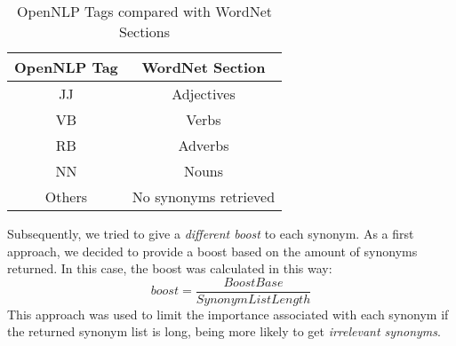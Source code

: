 \begin{table}[tbp]
    \caption{OpenNLP Tags compared with WordNet Sections}
    \label{tab:opennlp-tags}
    \centering
    \begin{tabular}{|c|c|}
        \toprule
        \textbf{OpenNLP Tag} & \textbf{WordNet Section}\\
        \midrule
        JJ & Adjectives\\
        
        VB & Verbs\\
        
        RB & Adverbs\\
        
        NN & Nouns\\
        
        Others & No synonyms retrieved\\
        \bottomrule
    \end{tabular}
\end{table}

Subsequently, we tried to give a \emph{different boost} to each synonym. As a first approach, we decided to provide a boost based on the amount of synonyms returned. In this case, the boost was calculated in this way: 
\begin{equation}
boost=\frac{Boost Base}{Synonym List Length}
\end{equation}
This approach was used to limit the importance associated with each synonym if the returned synonym list is long, being more likely to get \emph{irrelevant synonyms}.

